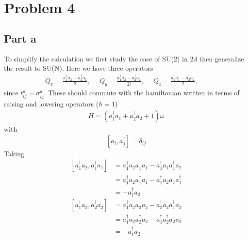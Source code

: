 \documentclass[a4paper,12pt]{article}
\begin{document}
\section*{Problem 4}
\subsection*{Part a}
To simplify the calculation we first study the case of SU(2) in 2d then generalize the result to SU(N). Here we have three operators
\begin{equation}
	\begin{aligned}
		Q_x=\frac{a_1^\dagger a_2+a_2^\dagger a_1}{2},~~~~~~
		Q_y=\frac{a_1^\dagger a_2-a_2^\dagger a_1}{2i},~~~~~~
		Q_z=\frac{a_1^\dagger a_1-a_2^\dagger a_2}{2},~~~~~~
	\end{aligned}
\end{equation}
since $t^a_{ij}=\sigma_{ij}^a$. These should commute with the hamiltonian written in terms of raising and lowering operators ($\hbar=1$)
\begin{equation}
	\begin{aligned}
		H=(a_1^\dagger a_1+a_2^\dagger a_2+1)\omega 
	\end{aligned}
\end{equation}
with 
\begin{equation}
	\begin{aligned}
		\left[a_i,a^\dagger_j\right]=\delta_{ij}
	\end{aligned}
\end{equation}
Taking
\begin{equation}
	\begin{aligned}
		\left[a_1^\dagger a_2,a_1^\dagger a_1\right]&=a_1^\dagger a_2a_1^\dagger a_1-a_1^\dagger a_1a_1^\dagger a_2\\
		&=a_1^\dagger a_2a_1^\dagger a_1-a_1^\dagger a_2 a_1a_1^\dagger \\
		&=-a_1^\dagger a_2 
	\end{aligned}
\end{equation}
\begin{equation}
	\begin{aligned}
		\left[a_1^\dagger a_2,a_2^\dagger a_2\right]&=a_1^\dagger a_2a_2^\dagger a_2-a_2^\dagger a_2a_1^\dagger a_2\\
		&=a_1^\dagger a_2a_2^\dagger a_2-a_1^\dagger a_2^\dagger a_2 a_2\\
		&=-a_1^\dagger a_2	\end{aligned}
\end{equation}
\end{document}
